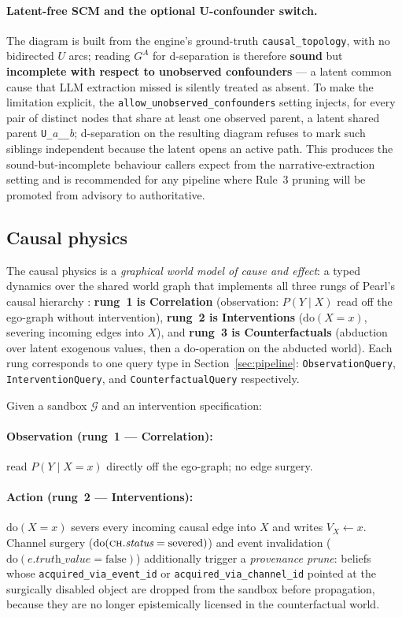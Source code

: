 \documentclass[11pt]{article}
\begin{document}
\paragraph{Latent-free SCM and the optional U-confounder switch.}
The diagram is built from the engine's ground-truth
\texttt{causal\_topology}, with no bidirected $U$ arcs; reading
$G^A$ for d-separation is therefore \textbf{sound} but
\textbf{incomplete with respect to unobserved confounders} --- a
latent common cause that LLM extraction missed is silently
treated as absent. To make the limitation explicit, the
\texttt{allow\_unobserved\_confounders} setting injects, for
every pair of distinct nodes that share at least one observed
parent, a latent shared parent
\texttt{U\_}\textit{a}\texttt{\_\_}\textit{b}; d-separation on
the resulting diagram refuses to mark such siblings independent
because the latent opens an active path. This produces the
sound-but-incomplete behaviour callers expect from the
narrative-extraction setting and is recommended for any pipeline
where Rule~3 pruning will be promoted from advisory to
authoritative.

\subsection{Causal physics}
\label{app:causal}

The causal physics is a \emph{graphical world model of cause and
effect}: a typed dynamics over the shared world graph that
implements all three rungs of Pearl's causal hierarchy
\citep{pearl2009causality,bareinboim2022pearl}:
\textbf{rung~1 is Correlation} (observation: $P(Y \mid X)$ read off
the ego-graph without intervention), \textbf{rung~2 is
Interventions} ($\mathrm{do}(X = x)$, severing incoming edges into
$X$), and \textbf{rung~3 is Counterfactuals} (abduction over
latent exogenous values, then a do-operation on the abducted
world). Each rung corresponds to one query type in
Section~\ref{sec:pipeline}: \texttt{ObservationQuery},
\texttt{InterventionQuery}, and \texttt{CounterfactualQuery}
respectively.

Given a sandbox $\mathcal{G}$ and an intervention specification:
\paragraph{Observation (rung~1 --- Correlation):} read
$P(Y \mid X = x)$ directly off the ego-graph; no edge surgery.
\paragraph{Action (rung~2 --- Interventions):} $\mathrm{do}(X = x)$
severs every incoming causal edge into $X$ and writes
$V_X \leftarrow x$. Channel surgery
($\mathrm{do}(\textsc{ch}.\textit{status} = \text{severed})$) and
event invalidation ($\mathrm{do}(e.\textit{truth\_value} =
\text{false})$) additionally trigger a \emph{provenance prune}:
beliefs whose \texttt{acquired\_via\_event\_id} or
\texttt{acquired\_via\_channel\_id} pointed at the surgically
disabled object are dropped from the sandbox before propagation,
because they are no longer epistemically licensed in the
counterfactual world.
\end{document}
